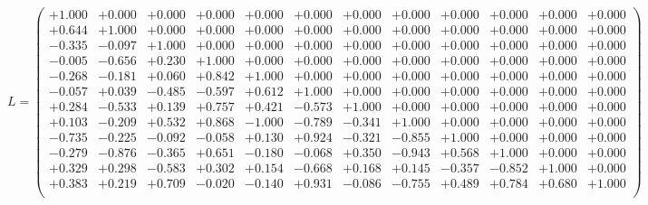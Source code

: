 \documentclass[9pt]{article}
\theoremstyle{plain}
\theoremstyle{definition}
\theoremstyle{remark}
\numberwithin{equation}{section}
\begin{document}
$L = \left(
\begin{array}{
cccccccccccc}
+1.000 & +0.000 & +0.000 & +0.000 & +0.000 & +0.000 & +0.000 & +0.000 & +0.000 & +0.000 & +0.000 & +0.000 \\
+0.644 & +1.000 & +0.000 & +0.000 & +0.000 & +0.000 & +0.000 & +0.000 & +0.000 & +0.000 & +0.000 & +0.000 \\
-0.335 & -0.097 & +1.000 & +0.000 & +0.000 & +0.000 & +0.000 & +0.000 & +0.000 & +0.000 & +0.000 & +0.000 \\
-0.005 & -0.656 & +0.230 & +1.000 & +0.000 & +0.000 & +0.000 & +0.000 & +0.000 & +0.000 & +0.000 & +0.000 \\
-0.268 & -0.181 & +0.060 & +0.842 & +1.000 & +0.000 & +0.000 & +0.000 & +0.000 & +0.000 & +0.000 & +0.000 \\
-0.057 & +0.039 & -0.485 & -0.597 & +0.612 & +1.000 & +0.000 & +0.000 & +0.000 & +0.000 & +0.000 & +0.000 \\
+0.284 & -0.533 & +0.139 & +0.757 & +0.421 & -0.573 & +1.000 & +0.000 & +0.000 & +0.000 & +0.000 & +0.000 \\
+0.103 & -0.209 & +0.532 & +0.868 & -1.000 & -0.789 & -0.341 & +1.000 & +0.000 & +0.000 & +0.000 & +0.000 \\
-0.735 & -0.225 & -0.092 & -0.058 & +0.130 & +0.924 & -0.321 & -0.855 & +1.000 & +0.000 & +0.000 & +0.000 \\
-0.279 & -0.876 & -0.365 & +0.651 & -0.180 & -0.068 & +0.350 & -0.943 & +0.568 & +1.000 & +0.000 & +0.000 \\
+0.329 & +0.298 & -0.583 & +0.302 & +0.154 & -0.668 & +0.168 & +0.145 & -0.357 & -0.852 & +1.000 & +0.000 \\
+0.383 & +0.219 & +0.709 & -0.020 & -0.140 & +0.931 & -0.086 & -0.755 & +0.489 & +0.784 & +0.680 & +1.000 \\
\end{array}
\right)$ \newline 
\end{document}
